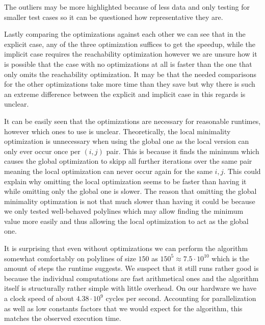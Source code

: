 The outliers may be more highlighted because of less data and only testing for smaller test cases so it can be questioned how representative they are. 

Lastly comparing the optimizations against each other we can see that in the explicit case, any of the three optimization suffices to get the speedup, while the implicit case requires the reachability optimization however we are unsure how it is possible that the case with no optimizations at all is faster than the one that only omits the reachability optimization. It may be that the needed comparisons for the other optimizations take more time than they save but why there is such an extreme difference between the explicit and implicit case in this regards is unclear. 

It can be easily seen that the optimizations are necessary for reasonable runtimes, however which ones to use is unclear. Theoretically, the local minimality optimization is unnecessary when using the global one as the local version can only ever occur once per \((i, j)\) pair. This is because it finds the minimum which causes the global optimization to skipp all further iterations over the same pair meaning the local optimization can never occur again for the same \(i, j\). This could explain why omitting the local optimization seems to be faster than having it while omitting only the global one is slower. The reason that omitting the global minimality optimzation is not that much slower than having it could be because we only tested well-behaved polylines which may allow finding the minimum value more easily and thus allowing the local optimization to act as the global one. 

It is surprising that even without optimizations we can perform the algorithm somewhat comfortably on polylines of size \(150\) as \(150^5 \approx 7.5 \cdot 10^10\) which is the amount of steps the runtime suggests. We suspect that it still runs rather good is because the individual computations are fast arithmetical ones and the algorithm itself is structurally rather simple with little overhead. On our hardware we have a clock speed of about \(4.38 \cdot 10^9\) cycles per second. Accounting for parallelization as well as low constants factors that we would expect for the algorithm, this matches the observed execution time.

